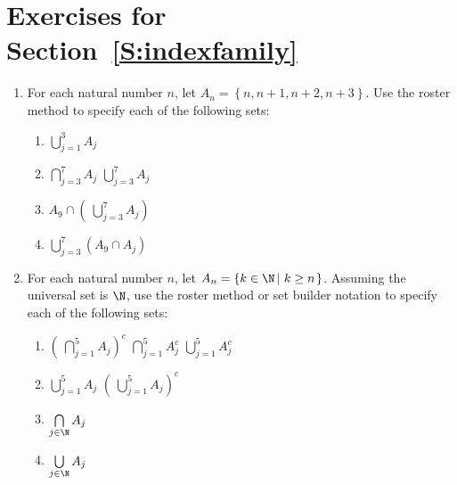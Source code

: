 \section*{Exercises for Section~\ref{S:indexfamily}}
%
\begin{enumerate}
\item For each natural number $n$, let $A_n = \left\{n, n+1, n+2, n+3 \right\}$.  Use the roster method to specify each of the following sets: \label{exer:sec45-example1}

\begin{multicols}{2}
\begin{enumerate}
\yitem $\bigcap\limits_{j=1}^{3}A_j$
\item $\bigcup\limits_{j=1}^{3}A_j$
\item $\bigcap\limits_{j=3}^{7}A_j$
\yitem $\bigcup\limits_{j=3}^{7}A_j$
\item $A_9 \cap \left(\:\bigcup\limits_{j=3}^{7}A_j \right)$
\item $\bigcup\limits_{j=3}^{7}\left( A_9 \cap A_j \right)$
\end{enumerate}
\end{multicols}


\item For each natural number $n$, let 
$A_n = \left\{ k \in \N \left| \hspace{3pt} k \geq n \right. \right\}$.  Assuming the universal set is $\N$, use the roster method or set builder notation to specify each of the following sets: \label{exer:sec45-example2}

\begin{multicols}{2}
\begin{enumerate}
\yitem $\bigcap\limits_{j=1}^{5}A_j$
\item $\left(\: \bigcap\limits_{j=1}^{5}A_j \right)^c$
\yitem $\bigcap\limits_{j=1}^{5}A_j^c$
\yitem $\bigcup\limits_{j=1}^{5}A_j^c$
\item $\bigcup\limits_{j=1}^{5}A_j$
\yitem $\left(\: \bigcup\limits_{j=1}^{5}A_j \right)^c$
\item $\bigcap\limits_{j \in \N}^{}A_j$
\item $\bigcup\limits_{j \in \N}^{}A_j$
\end{enumerate}
\end{multicols}


\end{enumerate}
